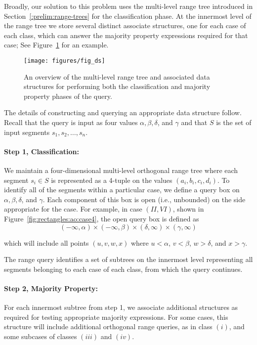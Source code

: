 Broadly, our solution to this problem uses the multi-level range tree introduced in Section~\ref{:prelim:range-trees} for the classification phase. At the innermost level of the range tree we store several distinct associate structures, one for each case of each class, which can answer the majority property expressions required for that case; See Figure~\ref{fig:rectangles:ao:overview} for an example.

\begin{figure}[t]
\begin{center}
  \texttt{[image: figures/fig\_ds]}
  \caption[An overview of the multi-level range tree required for arbitrarily-oriented segments]{An overview of the multi-level range tree and associated data structures for performing both the classification and majority property phases of the query.}
  \label{fig:rectangles:ao:overview}
\end{center}
\end{figure}

The details of constructing and querying an appropriate data structure follow. Recall that the query is input as four values $\alpha, \beta, \delta$, and $\gamma$ and that $S$ is the set of input segments $s_1, s_2, \ldots, s_n$.

\paragraph{Step 1, Classification:} We maintain a four-dimensional multi-level orthogonal range tree where each segment $s_i \in S$ is represented as a 4-tuple on the values $(a_i, b_i, c_i, d_i)$. To identify all of the segments within a particular case, we define a query box on $\alpha, \beta, \delta$, and $\gamma$. Each component of this box is open (i.e., unbounded) on the side appropriate for the case. For example, in case $(II, VI)$, shown in Figure~\ref{fig:rectangles:ao:case4}, the open query box is defined as
\[
(-\infty, \alpha) \times (-\infty, \beta) \times (\delta, \infty) \times (\gamma, \infty)
\]

\noindent which will include all points $(u, v, w, x)$ where $u < \alpha$, $v < \beta$, $w > \delta$, and $x > \gamma$.

The range query identifies a set of subtrees on the innermost level representing all segments belonging to each case of each class, from which the query continues.

\paragraph{Step 2, Majority Property:} For each innermost subtree from step 1, we associate additional structures as required for testing appropriate majority expressions. For some cases, this structure will include additional orthogonal range queries, as in class $(i)$, and some subcases of classes $(iii)$ and $(iv)$.

